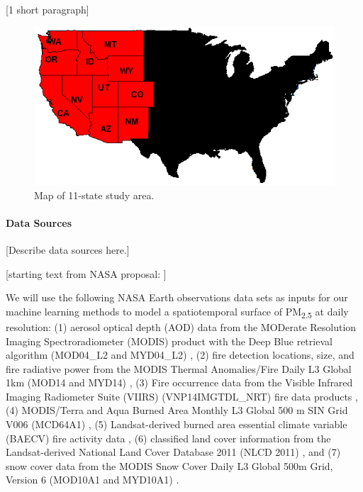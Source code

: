 \documentclass[authoryear]{elsarticle}
\begin{document}
[1 short paragraph]

\begin{figure}%
\includegraphics[width=1\textwidth]{WesternStatesNoTitleCropped.png} %
\caption{\label{fig:Map11States}Map of 11-state study area.} %
\end{figure} %

\paragraph{Data Sources} [Describe data sources here.]

[starting text from NASA proposal: ]

We will use the following NASA Earth observations data sets as inputs for our machine learning methods to model a spatiotemporal surface of PM\textsubscript{2.5} at daily resolution: 
(1) aerosol optical depth (AOD) data from the MODerate Resolution Imaging Spectroradiometer (MODIS) product with the Deep Blue retrieval algorithm (MOD04\_L2 and MYD04\_L2) \citep{Sayer2013}, 
(2) fire detection locations, size, and fire radiative power from the MODIS Thermal Anomalies/Fire Daily L3 Global 1km (MOD14 and MYD14) \citep{Giglio2006}, 
(3) Fire occurrence data from the Visible Infrared Imaging Radiometer Suite (VIIRS) (VNP14IMGTDL\_NRT) fire data products \citep{Schroeder2014}, 
(4) MODIS/Terra and Aqua Burned Area Monthly L3 Global 500 m SIN Grid V006 (MCD64A1) \citep{MODISBurnArea}, 
(5) Landsat-derived burned area essential climate variable (BAECV) fire activity data \citep{Hawbaker2017}, 
(6) classified land cover information from the Landsat-derived National Land Cover Database 2011 (NLCD 2011) \citep{Homer2017}, and 
(7) snow cover data from the MODIS Snow Cover Daily L3 Global 500m Grid, Version 6 (MOD10A1 and MYD10A1) \citep{Hall2016}.
\end{document}

